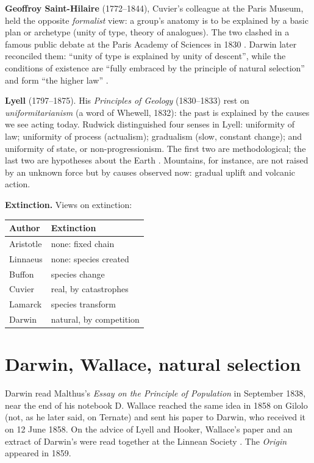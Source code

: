 \textbf{Geoffroy Saint-Hilaire}
(1772--1844), Cuvier's colleague at the
Paris Museum, held the opposite
\emph{formalist} view: a group's anatomy
is to be explained by a basic plan or
archetype (unity of type,
theory of analogues). The two clashed in a
famous public debate at the Paris Academy
of Sciences in 1830
\cite{zamora2008forma}. Darwin later
reconciled them: ``unity of type is
explained by unity of descent'', while the
conditions of existence are ``fully
embraced by the principle of natural
selection'' and form ``the higher law''
\cite[Chapter VI]{darwin2008origin}.

\textbf{Lyell} (1797--1875). His
\emph{Principles of Geology} (1830--1833)
rest on \emph{uniformitarianism} (a word of
Whewell, 1832): the past is explained by
the causes we see acting today. Rudwick
distinguished four senses in Lyell:
uniformity of law; uniformity of process
(actualism); gradualism (slow, constant
change); and uniformity of state, or
non-progressionism. The first two are
methodological; the last two are
hypotheses about the Earth
\cite{bueno2008lyell}. Mountains, for
instance, are not raised by an unknown
force but by causes observed now: gradual
uplift and volcanic action.

\textbf{Extinction.} Views on extinction:
\begin{center}
\begin{tabular}{ll}
Author & Extinction \\
\hline
Aristotle & none: fixed chain \\
Linnaeus & none: species created \\
Buffon & species change \\
Cuvier & real, by catastrophes \\
Lamarck & species transform \\
Darwin & natural, by competition
\end{tabular}
\end{center}

\section{Darwin, Wallace, natural selection}
\label{section-darwin-wallace}

Darwin read Malthus's \emph{Essay on the
Principle of Population} in September
1838, near the end of his notebook D.
Wallace reached the same idea in 1858 on
Gilolo (not, as he later said, on Ternate)
and sent his paper to Darwin, who received
it on 12 June 1858. On the advice of Lyell
and Hooker, Wallace's paper and an extract
of Darwin's were read together at the
Linnean Society \cite{bowler-salida}. The
\emph{Origin} appeared in 1859.

